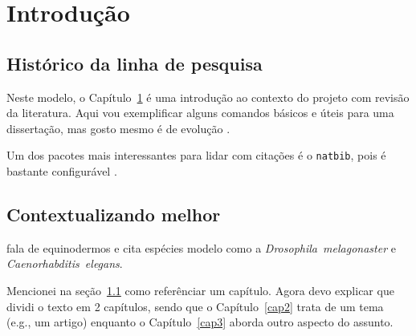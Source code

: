 \chapter{Introdução}\label{intro}
\section{Histórico da linha de pesquisa}\label{intro:historico}


Neste modelo, o Capítulo~\ref{intro} é uma introdução ao contexto do projeto com revisão da literatura.
Aqui vou exemplificar alguns comandos básicos e úteis para uma dissertação, mas gosto mesmo é de evolução \citep{Buss1987,Kutschera2004}.

Um dos pacotes mais interessantes para lidar com citações é o \texttt{natbib}, pois é bastante configurável \citep[ver detalhes em][]{Arthur2002}.

\section{Contextualizando melhor}\label{intro:contexto}

\citet{Hart2002} fala de equinodermos e cita espécies modelo como a \emph{Drosophila~melagonaster} e \emph{Caenorhabditis~elegans}.

Mencionei na seção~\ref{intro:historico} como referênciar um capítulo.
Agora devo explicar que dividi o texto em 2 capítulos, sendo que o Capítulo~\ref{cap2} trata de um tema (e.g., um artigo) enquanto o Capítulo~\ref{cap3} aborda outro aspecto do assunto.


